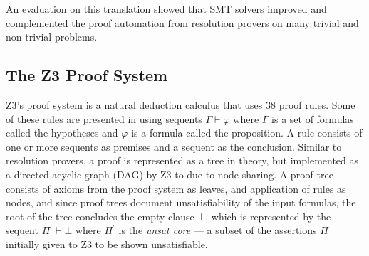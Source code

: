 \documentclass{article}
\begin{document}
		An evaluation on this translation showed that SMT 
		solvers improved and complemented the proof automation 
		from resolution provers on many trivial and non-trivial 
		problems.
		
	\subsection{The Z3 Proof System}
		Z3's proof system is a natural deduction 
		calculus that uses 38 proof rules. Some of 
		these rules are presented in 
		using sequents $\Gamma \vdash \varphi$ where 
		$\Gamma$ is a set of formulas called the hypotheses
		and $\varphi$ is a formula called the proposition. 
		A rule consists of one or more sequents as 
		premises and a sequent as the conclusion. 
		Similar to resolution provers, a proof is 
		represented as a tree in theory, but implemented 
		as a directed acyclic graph (DAG) by Z3 to 
		due to node sharing. A proof tree consists of axioms 
		from the proof system as leaves, and application 
		of rules as nodes, and since proof trees 
		document unsatisfiability of the input 
		formulas, the root of the tree concludes the 
		empty clause $\bot$, which is represented by 
		the sequent $\Pi^\prime \vdash \bot$ where 
		$\Pi^\prime$ is the \textit{unsat core} --- 
		a subset of the assertions $\Pi$
		initially given to Z3 to be shown unsatisfiable.
		
\end{document}
